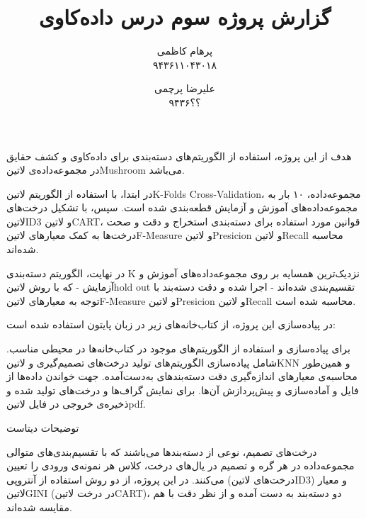\documentclass[a4paper,12pt]{article}
\title{گزارش پروژه سوم درس داده‌کاوی}
\author{
پرهام کاظمی \\ ۹۴۳۶۱۱۰۴۳۰۱۸
\and
علیرضا پرچمی \\ ۹۴۳۶؟؟
}
\begin{document}
	\maketitle
	

هدف از این پروژه، استفاده از الگوریتم‌های دسته‌بندی  برای داده‌کاوی و کشف حقایق در مجموعه‌داده‌ی ‌لاتین{Mushroom} می‌باشد.

در ابتدا، با استفاده از الگوریتم ‌لاتین{K-Folds Cross-Validation}، مجموعه‌داده، ۱۰ بار به مجموعه‌داده‌های آموزش و آزمایش قطعه‌بندی شده است. سپس، با تشکیل درخت‌های ‌لاتین{ID3} و ‌لاتین{CART}، قوانین مورد استفاده برای دسته‌بندی استخراج و دقت و صحت درخت‌ها به کمک معیارهای ‌لاتین{F-Measure} و ‌لاتین{Presicion} و ‌لاتین{Recall} محاسبه شده‌اند. 

در نهایت، الگوریتم دسته‌بندی K نزدیک‌ترین همسایه  بر روی مجموعه‌داده‌های آموزش و آزمایش - که با روش ‌لاتین{hold out} تقسیم‌بندی شده‌اند - اجرا شده و دقت دسته‌بند با توجه به معیارهای  ‌لاتین{F-Measure} و ‌لاتین{Presicion} و ‌لاتین{Recall} محاسبه شده‌ است.
	
	
	در پیاده‌سازی این پروژه، از کتاب‌خانه‌های زیر در زبان پایتون استفاده شده است:
	
		  برای پیاده‌سازی و استفاده از الگوریتم‌های موجود در کتاب‌خانه‌ها در محیطی مناسب.
		 شامل پیاده‌سازی الگوریتم‌های تولید درخت‌های تصمیم‌گیری و ‌لاتین{KNN} و همین‌طور محاسبه‌ی معیارهای اندازه‌گیری دقت دسته‌بندهای به‌دست‌آمده.
		 جهت خواندن داده‌ها از فایل و آماده‌سازی و پیش‌پردازش آن‌ها.
		 برای نمایش گراف‌ها و درخت‌های تولید شده و ذخیره‌ی خروجی در فایل ‌لاتین{pdf}.
	
	
	توضیحات دیتاست
	
	
	درخت‌های تصمیم، نوعی از دسته‌بندها می‌باشند که با تقسیم‌بندی‌های متوالی مجموعه‌داده در هر گره و تصمیم در یال‌های درخت، کلاس هر نمونه‌ی ورودی را تعیین می‌کنند. در این پروژه، از دو روش استفاده از آنتروپی (درخت‌های ‌لاتین{ID3}) و معیار ‌لاتین{GINI} (در درخت ‌لاتین{CART})، دو دسته‌بند به دست آمده و از نظر دقت با هم مقایسه شده‌اند.
	
\end{document}
